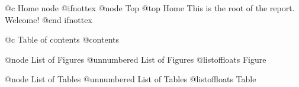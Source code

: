 @c Home node
@ifnottex
@node Top
@top Home
This is the root of the report. Welcome!
@end ifnottex

@c Table of contents
@contents

@node List of Figures
@unnumbered List of Figures
@listoffloats Figure

@node List of Tables
@unnumbered List of Tables
@listoffloats Table
